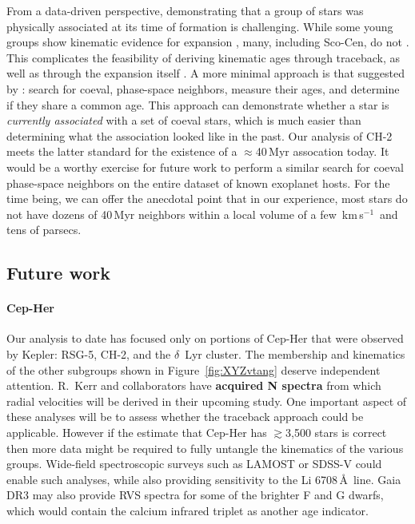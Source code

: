 \documentclass[12pt,twocolumn]{aastex63}
\newcommand{\kms}{\,km\,s$^{-1}$}
\begin{document}
From a data-driven perspective, demonstrating that a group of stars
was physically associated at its time of formation is challenging.
While some young groups show kinematic evidence for expansion
\citep{kuhn_kinematics_2019}, many, including Sco-Cen, do not
\citep{wright_kinematics_2018}.  This complicates the feasibility of
deriving kinematic ages through traceback, as
well as through the expansion itself
\citep[see][]{crundall_chronostar_2019}.  
A more minimal approach is
that suggested by \citet{tofflemire_2021}: search for coeval,
phase-space neighbors, measure their ages, and determine if they share
a common age.  This approach can demonstrate whether a star is {\it
currently associated} with a set of coeval stars, which is much easier
than determining what the association looked like in the past.  Our
analysis of CH-2 meets the latter standard for the existence of a
$\approx$40\,Myr assocation today.  It would be a worthy exercise for
future work to perform a similar search for coeval phase-space
neighbors on the entire dataset of known exoplanet hosts.  For the
time being, we can offer the anecdotal point that in our experience,
most stars do not have dozens of 40\,Myr neighbors within a
local volume of a few \kms\ and tens of parsecs.


\subsection{Future work}

\paragraph{Cep-Her}
Our analysis to date has focused only on portions of Cep-Her that were
observed by Kepler: RSG-5, CH-2, and the $\delta$~Lyr cluster.  The
membership and kinematics of the other subgroups shown in
Figure~\ref{fig:XYZvtang} deserve independent attention.  R.~Kerr and
collaborators have {\bf acquired N spectra} from which radial
velocities will be derived in their upcoming study.
One important aspect of these analyses will be to assess whether the 
traceback approach could be applicable.
However if the
estimate that Cep-Her has $\gtrsim$3{,}500 stars is correct then more
data might be required to fully untangle the kinematics of the various
groups.  Wide-field spectroscopic surveys such as LAMOST
\citep{zhao_2012_LAMOST} or SDSS-V \citep{kollmeier_2017} could
enable such analyses, while also
providing sensitivity to the Li 6708\,\AA\ line.  Gaia
DR3 may also provide RVS spectra for some of the brighter F and G
dwarfs, which would contain the calcium infrared triplet as another
age indicator.
\end{document}
